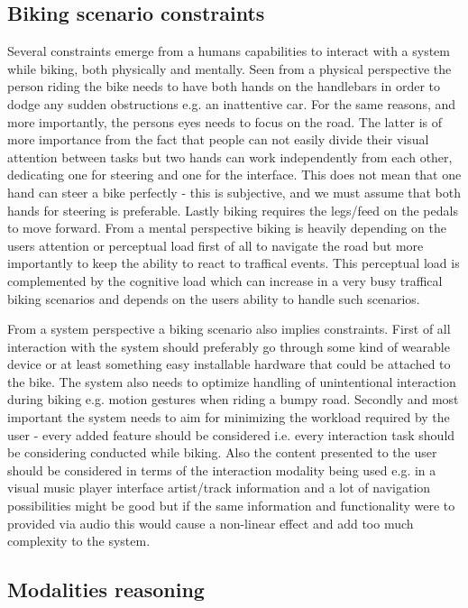 \subsection{Biking scenario constraints}
Several constraints emerge from a humans capabilities to interact with a system while biking, both physically and mentally. Seen from a physical perspective the person riding the bike needs to have both hands on the handlebars in order to dodge any sudden obstructions e.g. an inattentive car. For the same reasons, and more importantly, the persons eyes needs to focus on the road. The latter is of more importance from the fact that people can not easily divide their visual attention between tasks \cite{brewster_overcoming_2002} but two hands can work independently from each other, dedicating one for steering and one for the interface. This does not mean that one hand can steer a bike perfectly - this is subjective, and we must assume that both hands for steering is preferable. Lastly biking requires the legs/feed on the pedals to move forward. From a mental perspective biking is heavily depending on the users attention or perceptual load first of all to navigate the road but more importantly to keep the ability to react to traffical events. This perceptual load is complemented by the cognitive load which can increase in a very busy traffical biking scenarios and depends on the users ability to handle such scenarios.

From a system perspective a biking scenario also implies constraints. First of all interaction with the system should preferably go through some kind of wearable device or at least something easy installable hardware that could be attached to the bike. The system also needs to optimize handling of unintentional interaction during biking e.g. motion gestures when riding a bumpy road. Secondly and most important the system needs to aim for minimizing the workload required by the user - every added feature should be considered i.e. every interaction task should be considering conducted while biking. Also the content presented to the user should be considered in terms of the interaction modality being used e.g. in a visual music player interface artist/track information and a lot of navigation possibilities might be good but if the same information and functionality were to provided via audio this would cause a non-linear effect and add too much complexity to the system.

\subsection{Modalities reasoning}

